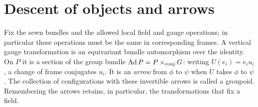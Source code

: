 \section{Descent of objects and arrows}

Fix the sewn bundles and the allowed local field and gauge operations; in particular these operations must be the same in corresponding frames. A vertical gauge transformation is an equivariant bundle automorphism over the identity. On $P$ it is a section of the group bundle $\operatorname{Ad}P=P\times_{\rm conj}G$: writing $U(e_i)=e_i u_i$, a change of frame conjugates $u_i$. It is an \emph{arrow} from $\phi$ to $\psi$ when $U$ takes $\phi$ to $\psi$. The collection of configurations with these invertible arrows is called a groupoid. Remembering the arrows retains, in particular, the transformations that fix a field.

